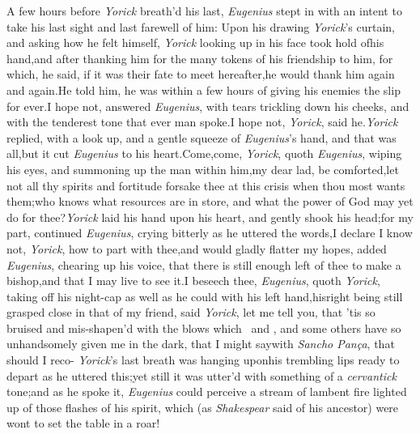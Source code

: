 \documentclass{article}
\begin{document}
A few hours before \textit{Yorick} breath’d his last, \textit{Eugenius} stept in
with an intent to take his last sight and last farewell of him: Upon his drawing
\textit{Yorick}’s curtain, and asking how he felt himself, \textit{Yorick} looking
up in his face took hold of\break his hand,\tsk  and after thanking him\pb
for the many tokens of his friendship to him, for which, he said,
if it was their fate to meet hereafter,\tsk  he would thank him again and
again.\tsk  He told him, he was within a few hours of giving his enemies the
slip for ever.\tsk  I hope not, answered \textit{Eugenius}, with tears trickling
down his cheeks, and with the tenderest tone that ever man spoke.\tsk  I hope
not,\break
\textit{Yorick}, said he.\tsh  \textit{Yorick} replied, with a look
up, and a gentle squeeze of \textit{Eugenius}’s hand, and that was
all,\tsh  but it cut \textit{Eugenius} to his heart.\tsh Come,\tsh\break  come,
\textit{Yorick}, quoth \textit{Eugenius}, wiping his eyes, and summoning up the
man\break
within him,\tsk  my dear lad, be comfort\-ed,\tsk  let not all thy spirits and
fortitude forsake thee at this crisis when thou most wants
them;\tsh  who knows what resources are in store, and what the power of
God may yet do for thee?\tsh  \textit{Yorick}\pb
laid his hand upon his
heart, and gently shook his head;\tsk  for my part, continued \textit{Eugenius},
crying bitterly as he uttered the words,\tsk  I declare I know not,
\textit{Yorick}, how to part with thee,\tsh and\break 
would gladly flatter my hopes, added\break
\textit{Eugenius}, chearing up his voice, that\break
there is still enough left of thee to make\break
a bishop,\tsk and that I may live to see\break 
it.\tsk  I beseech thee, \textit{Eugenius}, quoth\break
\textit{Yorick}, taking off his night-cap as well as he
could with his left hand,\tsk  his\break right being still grasped close in that of
my friend, said
\textit{Yorick}, let me tell you, that ’tis so bruised and mis-shapen’d
with the blows which \astv\ and \astv, and some others have so unhandsomely
given me in the dark, that I might say\pb with \textit{Sancho Pança}, that should I
reco-\break 
{}
\textit{Yorick}’s last breath was hanging upon\break his
trembling lips ready to depart as he uttered this;\tsh  yet still it
was utter’d with something of a \textit{cervantick} tone;\tsh\break and as he
spoke it, \textit{Eugenius} could perceive a stream of lambent fire lighted up
 of those flashes of his
spirit, which (as \textit{Shakespear} said of his ancestor) were wont to set the
table in a roar!
\end{document}
